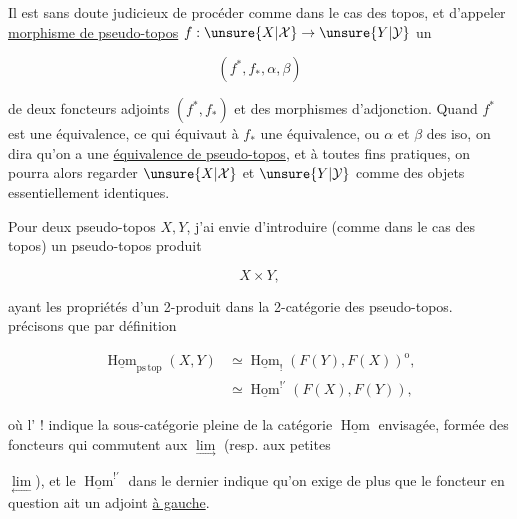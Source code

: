 Il est sans doute judicieux de procéder comme dans le cas des topos, et d'appeler \uline{morphisme de pseudo-topos} $f:\unsure{X|\mathcal X}\to\unsure{Y|\mathcal Y}$ un 

\[
(f^{*},f_{*},\alpha,\beta)
\tag*{(4.1.3)}
\]

de deux foncteurs adjoints $(f^{*},f_{*})$ et des morphismes d'adjonction. Quand $f^{*}$ est une équivalence, ce qui équivaut à $f_{*}$ une équivalence, ou $\alpha$ et $\beta$ des iso, on dira qu'on a une \uline{équivalence de pseudo-topos}, et à toutes fins pratiques, on pourra alors regarder $\unsure{X|\mathcal X}$ et $\unsure{Y|\mathcal Y}$ comme des objets essentiellement identiques.

 Pour deux pseudo-topos $X,Y$, j'ai envie d'introduire (comme dans le cas des topos) un pseudo-topos produit

\[
X\times Y,
\tag*{(4.1.4)}
\]


ayant les propriétés d'un 2-produit dans la 2-catégorie des pseudo-topos.  précisons que par définition

\[
\begin{aligned}
\underline{\operatorname{Hom}}_{\mathrm{ps\,top}}(X,Y)
&\simeq\underline{\operatorname{Hom}}_{!}(F(Y),F(X))^{\mathrm{o}},\\
&\simeq\underline{\operatorname{Hom}}^{!'}(F(X),F(Y)),
\end{aligned}
\tag*{(4.1.5)}
\]

où l' !  indique la sous-catégorie pleine de la catégorie $\underline{\operatorname{Hom}}$ envisagée, formée des foncteurs qui commutent aux  $\underset{\longrightarrow}{\lim}$ (resp. aux petites

$\underset{\longleftarrow}{\lim}$), et  le $\underline{\operatorname{Hom}}^{!'}$ dans le dernier  indique qu'on exige de plus que le foncteur en question ait un adjoint \uline{à gauche}.

